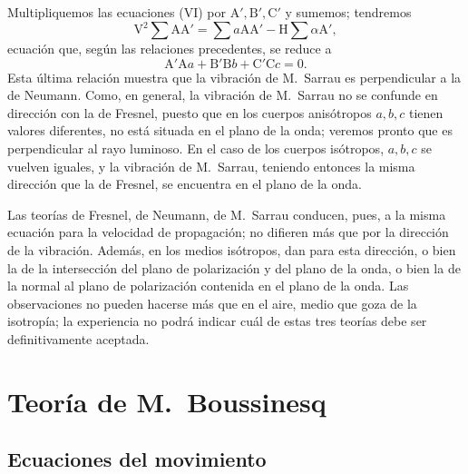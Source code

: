 Multipliquemos las ecuaciones (VI) por $\mathrm A',\mathrm B',\mathrm C'$
y sumemos; tendremos
\[
\mathrm V^2\sum \mathrm{AA}'=\sum a\mathrm{AA}'-\mathrm H\sum \alpha \mathrm A',
\]
ecuación que, según las relaciones precedentes, se reduce a
\[
\mathrm A'\mathrm Aa+\mathrm B'\mathrm Bb+\mathrm C'\mathrm Cc=0.
\]
Esta última relación muestra que la vibración de M.~Sarrau es
perpendicular a la de Neumann. Como, en general, la vibración de M.~Sarrau
no se confunde en dirección con la de Fresnel, puesto que en los cuerpos
anisótropos $a,b,c$ tienen valores diferentes, no está situada en el plano
de la onda; veremos pronto que es perpendicular al rayo luminoso. En el
caso de los cuerpos isótropos, $a,b,c$ se vuelven iguales, y la vibración
de M.~Sarrau, teniendo entonces la misma dirección que la de Fresnel, se
encuentra en el plano de la onda.

Las teorías de Fresnel, de Neumann, de M.~Sarrau conducen, pues, a la
misma ecuación para la velocidad de propagación; no difieren más que por
la dirección de la vibración. Además, en los medios isótropos, dan para
esta dirección, o bien la de la intersección del plano de polarización y
del plano de la onda, o bien la de la normal al plano de polarización
contenida en el plano de la onda. Las observaciones no pueden hacerse más
que en el aire, medio que goza de la isotropía; la experiencia no podrá
indicar cuál de estas tres teorías debe ser definitivamente aceptada.

\section{Teoría de M.~Boussinesq}

\subsection{Ecuaciones del movimiento}

